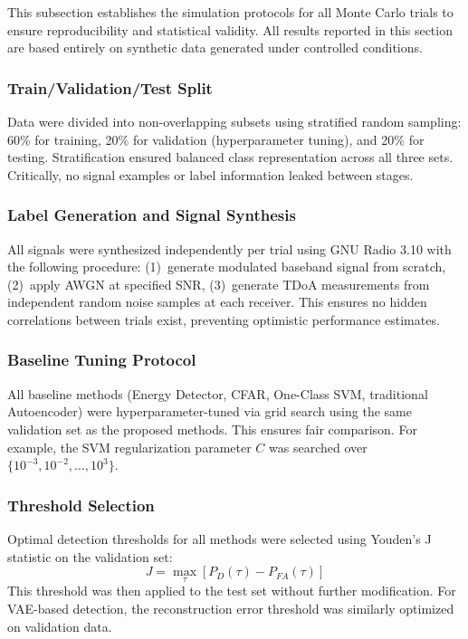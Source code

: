 \documentclass[sensors,article,submit,pdftex]{mdpi}
\begin{document}
This subsection establishes the simulation protocols for all Monte Carlo trials to ensure reproducibility and statistical validity. All results reported in this section are based entirely on synthetic data generated under controlled conditions.

\subsubsection{Train/Validation/Test Split}
Data were divided into non-overlapping subsets using stratified random sampling: 60\% for training, 20\% for validation (hyperparameter tuning), and 20\% for testing. Stratification ensured balanced class representation across all three sets. Critically, no signal examples or label information leaked between stages.

\subsubsection{Label Generation and Signal Synthesis}
All signals were synthesized independently per trial using GNU Radio 3.10 with the following procedure: (1)~generate modulated baseband signal from scratch, (2)~apply AWGN at specified SNR, (3)~generate TDoA measurements from independent random noise samples at each receiver. This ensures no hidden correlations between trials exist, preventing optimistic performance estimates.

\subsubsection{Baseline Tuning Protocol}
All baseline methods (Energy Detector, CFAR, One-Class SVM, traditional Autoencoder) were hyperparameter-tuned via grid search using the same validation set as the proposed methods. This ensures fair comparison. For example, the SVM regularization parameter $C$ was searched over $\{10^{-3}, 10^{-2}, \ldots, 10^3\}$.

\subsubsection{Threshold Selection}
Optimal detection thresholds for all methods were selected using Youden's J statistic on the validation set:
\begin{equation}
    J = \max_\tau [P_D(\tau) - P_{FA}(\tau)]
    \label{eq:youden}
\end{equation}
This threshold was then applied to the test set without further modification. For VAE-based detection, the reconstruction error threshold was similarly optimized on validation data.
\end{document}
